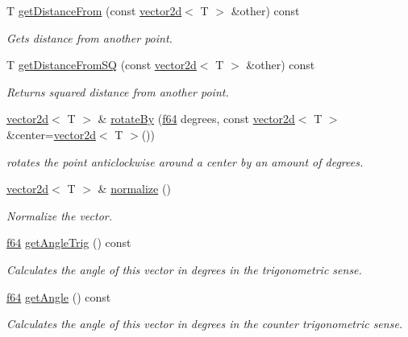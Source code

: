 \begin{DoxyCompactItemize}
T \hyperlink{classirr_1_1core_1_1vector2d_a351a36a3c2fff525fc17ec15c5d0207f}{get\+Distance\+From} (const \hyperlink{classirr_1_1core_1_1vector2d}{vector2d}$<$ T $>$ \&other) const
\begin{DoxyCompactList}\small\item\em Gets distance from another point. \end{DoxyCompactList}\item 
T \hyperlink{classirr_1_1core_1_1vector2d_aaf9107f38ae6a7e9bee6580440b53539}{get\+Distance\+From\+SQ} (const \hyperlink{classirr_1_1core_1_1vector2d}{vector2d}$<$ T $>$ \&other) const
\begin{DoxyCompactList}\small\item\em Returns squared distance from another point. \end{DoxyCompactList}\item 
\hyperlink{classirr_1_1core_1_1vector2d}{vector2d}$<$ T $>$ \& \hyperlink{classirr_1_1core_1_1vector2d_ac9c77997f6594d79d5daa5f6bf690ed2}{rotate\+By} (\hyperlink{namespaceirr_a1325b02603ad449f92c68fc640af9b28}{f64} degrees, const \hyperlink{classirr_1_1core_1_1vector2d}{vector2d}$<$ T $>$ \&center=\hyperlink{classirr_1_1core_1_1vector2d}{vector2d}$<$ T $>$())
\begin{DoxyCompactList}\small\item\em rotates the point anticlockwise around a center by an amount of degrees. \end{DoxyCompactList}\item 
\hyperlink{classirr_1_1core_1_1vector2d}{vector2d}$<$ T $>$ \& \hyperlink{classirr_1_1core_1_1vector2d_a5d5c360ed4c4fd28d4a42272634b8e55}{normalize} ()
\begin{DoxyCompactList}\small\item\em Normalize the vector. \end{DoxyCompactList}\item 
\hyperlink{namespaceirr_a1325b02603ad449f92c68fc640af9b28}{f64} \hyperlink{classirr_1_1core_1_1vector2d_a5aa73f5d0487d651af7dd3ea4a51ea67}{get\+Angle\+Trig} () const
\begin{DoxyCompactList}\small\item\em Calculates the angle of this vector in degrees in the trigonometric sense. \end{DoxyCompactList}\item 
\hyperlink{namespaceirr_a1325b02603ad449f92c68fc640af9b28}{f64} \hyperlink{classirr_1_1core_1_1vector2d_ad41700e8cbebb9899430c576140ee6fd}{get\+Angle} () const
\begin{DoxyCompactList}\small\item\em Calculates the angle of this vector in degrees in the counter trigonometric sense. \end{DoxyCompactList}\item 

\end{DoxyCompactItemize}
